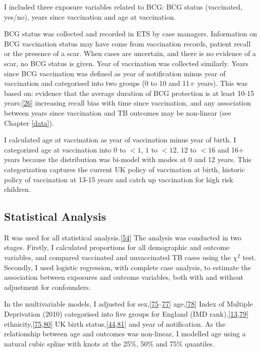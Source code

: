 \documentclass[11pt,twoside]{bristolthesis}
\begin{document}
  I included three exposure variables related to BCG: BCG status (vaccinated, yes/no), years since vaccination and age at vaccination.
  
  BCG status was collected and recorded in ETS by case managers. Information on BCG vaccination status may have come from vaccination records, patient recall or the presence of a scar. When cases are uncertain, and there is no evidence of a scar, no BCG status is given. Year of vaccination was collected similarly. Years since BCG vaccination was defined as year of notification minus year of vaccination and categorised into two groups (0 to 10 and 11+ years). This was based on: evidence that the average duration of BCG protection is at least 10-15 years;{[}\protect\hyperlink{ref-Abubakar2013}{26}{]} increasing recall bias with time since vaccination, and any association between years since vaccination and TB outcomes may be non-linear (see Chapter \ref{data}).
  
  I calculated age at vaccination as year of vaccination minus year of birth. I categorized age at vaccination into \(0\) to \(< 1\), \(1\) to \(< 12\), \(12\) to \(< 16\) and 16+ years because the distribution was bi-model with modes at 0 and 12 years. This categorization captures the current UK policy of vaccination at birth, historic policy of vaccination at 13-15 years and catch up vaccination for high risk children.
  
  \hypertarget{statistical-analysis-1}{%
  \subsection{Statistical Analysis}\label{statistical-analysis-1}}
  
  R was used for all statistical analysis.{[}\protect\hyperlink{ref-R}{54}{]} The analysis was conducted in two stages. Firstly, I calculated proportions for all demographic and outcome variables, and compared vaccinated and unvaccinated TB cases using the \(\chi ^2\) test. Secondly, I used logistic regression, with complete case analysis, to estimate the association between exposures and outcome variables, both with and without adjustment for confounders.
  
  In the multivariable models, I adjusted for sex,{[}\protect\hyperlink{ref-Parslow2001}{75}--\protect\hyperlink{ref-Aaby2014}{77}{]} age,{[}\protect\hyperlink{ref-Teale1993}{78}{]} Index of Multiple Deprivation (2010) categorised into five groups for England (IMD rank),{[}\protect\hyperlink{ref-Bhatti1995}{13},\protect\hyperlink{ref-DCLG2011}{79}{]} ethnicity,{[}\protect\hyperlink{ref-Parslow2001}{75},\protect\hyperlink{ref-Abubakar2008}{80}{]} UK birth status,{[}\protect\hyperlink{ref-French2007}{44},\protect\hyperlink{ref-Djuretic2002}{81}{]} and year of notification. As the relationship between age and outcomes was non-linear, I modelled age using a natural cubic spline with knots at the 25\%, 50\% and 75\% quantiles.
  
\end{document}
